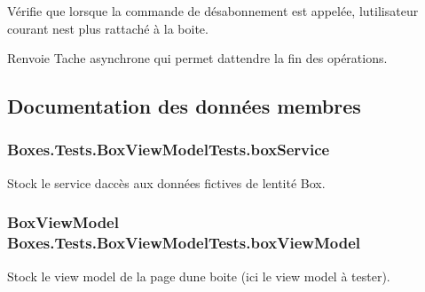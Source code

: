 Vérifie que lorsque la commande de désabonnement est appelée, l\textquotesingle{}utilisateur courant n\textquotesingle{}est plus rattaché à la boite. 

\begin{DoxyReturn}{Renvoie}
Tache asynchrone qui permet d\textquotesingle{}attendre la fin des opérations. 
\end{DoxyReturn}


\subsection{Documentation des données membres}
\subsubsection[{\texorpdfstring{box\+Service}{boxService}}]{ Boxes.\+Tests.\+Box\+View\+Model\+Tests.\+box\+Service\hspace{0.3cm}{\ttfamily [private]}}\hypertarget{class_boxes_1_1_tests_1_1_box_view_model_tests_a04618b94ae1c36e1d89ad38cb10ae7e9}{}\label{class_boxes_1_1_tests_1_1_box_view_model_tests_a04618b94ae1c36e1d89ad38cb10ae7e9}


Stock le service d\textquotesingle{}accès aux données fictives de l\textquotesingle{}entité Box. 

\subsubsection[{\texorpdfstring{box\+View\+Model}{boxViewModel}}]{\setlength{\rightskip}{0pt plus 5cm}Box\+View\+Model Boxes.\+Tests.\+Box\+View\+Model\+Tests.\+box\+View\+Model\hspace{0.3cm}{\ttfamily [private]}}\hypertarget{class_boxes_1_1_tests_1_1_box_view_model_tests_a551e212c039c5d0ae2356c19ec49ed34}{}\label{class_boxes_1_1_tests_1_1_box_view_model_tests_a551e212c039c5d0ae2356c19ec49ed34}


Stock le view model de la page d\textquotesingle{}une boite (ici le view model à tester). 

